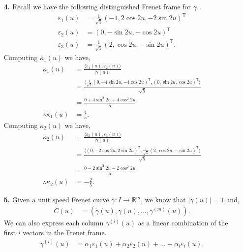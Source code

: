 \documentclass[a4paper]{article}
\newcommand{\ip}[2]{\langle #1, #2 \rangle}
\newcommand{\e}[1]{\varepsilon_{#1}(u)}
\newcommand{\dote}[1]{\dot{\varepsilon}_{#1}(u)}
\newcommand{\dotg}{\dot{\gamma}(u)}
\newcommand{\ddotg}{\ddot{\gamma}(u)}
\newcommand{\ds}{\displaystyle}
\begin{document}
\begin{enumerate}[leftmargin=*]
\item[\textbf{4.}]
	Recall we have the following distinguished Frenet frame for $\ds{\gamma}$.
	\begin{align*}
		\varepsilon_1(u) & = \frac{1}{\sqrt{5}}(-1, 2\cos{2u}, -2\sin{2u})^\mathsf{T} \\
		\varepsilon_2(u) & = (0, -\sin{2u}, -\cos{2u})^{\mathsf{T}} \\
		\varepsilon_3(u) &  = \frac{1}{\sqrt{5}}(2, \cos{2u}, -\sin{2u})^\mathsf{T}.
	\end{align*}
	Computing $\ds{\kappa_1(u)}$ we have,
	\begin{align*}
		\kappa_1(u) & = \frac{\ip{\dote{1}}{\e{2}}}{|\dotg|} \\
					& = \frac{\ip{\frac{1}{\sqrt{5}} (0, -4\sin{2u}, -4\cos{2u})^{\mathsf{T}}}{(0, \sin{2u}, \cos{2u})^{\mathsf{T}}}}{\sqrt{5}} \\
					& = \frac{0 + 4\sin^2{2u} + 4\cos^2{2u}}{5} \\
		\therefore \kappa_1(u) & = \frac{4}{5}. 
	\end{align*}
	Computing $\ds{\kappa_2(u)}$ we have,
	\begin{align*}
		\kappa_2(u) & = \frac{\ip{\dote{2}}{\e{3}}}{|\dotg|} \\
					& = \frac{\ip{(0, -2\cos{2u}, 2\sin{2u})^{\mathsf{T}}}{\frac{1}{\sqrt{5}} (2, \cos{2u}, -\sin{2u})^{\mathsf{T}}}}{\sqrt{5}} \\
					& = \frac{0 - 2\sin^2{2u} - 2\cos^2{2u}}{5} \\
		\therefore \kappa_2(u) & = -\frac{2}{5}.
	\end{align*}

\item[\textbf{5.}]
	Given a unit speed Frenet curve $\ds{\gamma : I \rightarrow \mathbb{R}^m}$, we know that $\ds{|\dotg| = 1}$ and, 
	\begin{align*}
		C(u) & = (\dotg, \ddotg, ... , \gamma^{(m)}(u)).
	\end{align*}
	We can also express each column $\ds{\gamma^{(i)}(u)}$ as a linear combination of the first $\ds{i}$ vectors in the Frenet frame.
	\begin{align*}
		\gamma^{(i)}(u) & = \alpha_1 \e{1} + \alpha_2 \e{2} + ... + \alpha_i \e{i}.
	\end{align*}
	


\end{enumerate}
\end{document}
